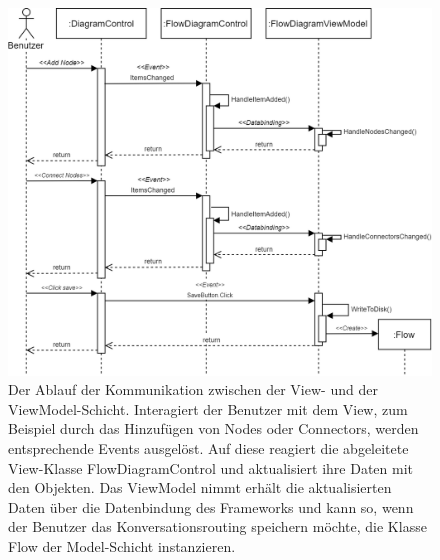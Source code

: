 \begin{figure} %
	\centering
		\includegraphics[width=\textwidth]{img/MVVMSequence.png}
	\caption[Kommunikationsablauf zwischen View- und ViewModel-Schicht]{Der Ablauf der Kommunikation zwischen der View- und der ViewModel-Schicht. Interagiert der Benutzer mit dem View, zum Beispiel durch das Hinzufügen von Nodes oder Connectors, werden entsprechende Events ausgelöst. Auf diese reagiert die abgeleitete View-Klasse FlowDiagramControl und aktualisiert ihre Daten mit den Objekten. Das ViewModel nimmt erhält die aktualisierten Daten über die Datenbindung des Frameworks und kann so, wenn der Benutzer das Konversationsrouting speichern möchte, die Klasse Flow der Model-Schicht instanzieren.}
	\label{fig:UML:MVVMSequence}
\end{figure}

